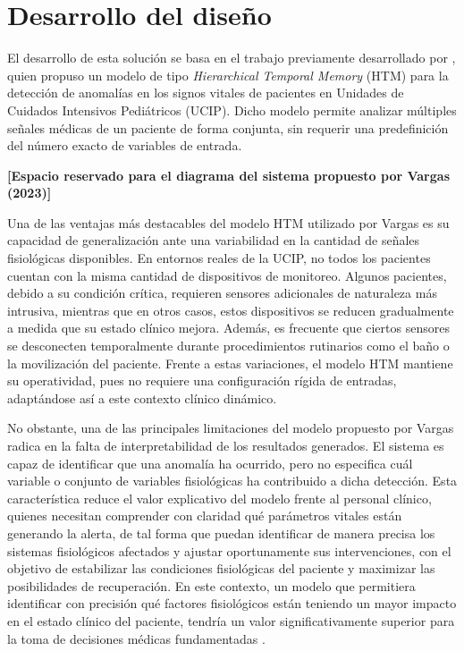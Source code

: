 \chapter{Desarrollo del diseño}

El desarrollo de esta solución se basa en el trabajo previamente desarrollado por \textcite{Vargas2023}, quien propuso un modelo de tipo \textit{Hierarchical Temporal Memory }(HTM) para la detección de anomalías en los signos vitales de pacientes en Unidades de Cuidados Intensivos Pediátricos (UCIP). Dicho modelo permite analizar múltiples señales médicas de un paciente de forma conjunta, sin requerir una predefinición del número exacto de variables de entrada.

\vspace{0.5cm}

\begin{center} \textbf{[Espacio reservado para el diagrama del sistema propuesto por Vargas (2023)]} \end{center}

\vspace{0.5cm}

Una de las ventajas más destacables del modelo HTM utilizado por Vargas es su capacidad de generalización ante una variabilidad en la cantidad de señales fisiológicas disponibles. En entornos reales de la UCIP, no todos los pacientes cuentan con la misma cantidad de dispositivos de monitoreo. Algunos pacientes, debido a su condición crítica, requieren sensores adicionales de naturaleza más intrusiva, mientras que en otros casos, estos dispositivos se reducen gradualmente a medida que su estado clínico mejora. Además, es frecuente que ciertos sensores se desconecten temporalmente durante procedimientos rutinarios como el baño o la movilización del paciente. Frente a estas variaciones, el modelo HTM mantiene su operatividad, pues no requiere una configuración rígida de entradas, adaptándose así a este contexto clínico dinámico.

No obstante, una de las principales limitaciones del modelo propuesto por Vargas radica en la falta de interpretabilidad de los resultados generados. El sistema es capaz de identificar que una anomalía ha ocurrido, pero no especifica cuál variable o conjunto de variables fisiológicas ha contribuido a dicha detección. Esta característica reduce el valor explicativo del modelo frente al personal clínico, quienes necesitan comprender con claridad qué parámetros vitales están generando la alerta, de tal forma que puedan identificar de manera precisa los sistemas fisiológicos afectados y ajustar oportunamente sus intervenciones, con el objetivo de estabilizar las condiciones fisiológicas del paciente y maximizar las posibilidades de recuperación. En este contexto, un modelo que permitiera identificar con precisión qué factores fisiológicos están teniendo un mayor impacto en el estado clínico del paciente, tendría un valor significativamente superior para la toma de decisiones médicas fundamentadas \parencite{zhang2023interpretable}.

